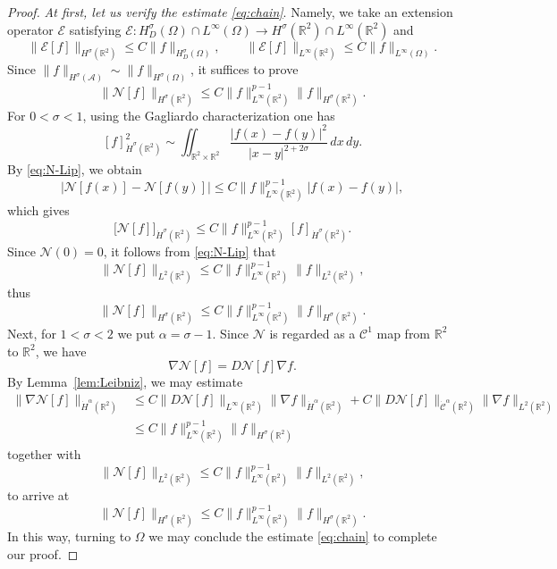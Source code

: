 \documentclass[10pt,a4paper]{amsart}
\numberwithin{equation}{section}
\begin{document}
\begin{proof}
\textit{At first, let us verify the estimate \eqref{eq:chain}}. Namely, we take an extension operator \(\mathcal{E}\) satisfying $\mathcal{E}:H^\sigma_D(\Omega)\cap L^\infty(\Omega)
\to
H^\sigma(\mathbb R^2)\cap L^\infty(\mathbb R^2)$ and
\[
\big\|\mathcal{E}[f]\big\|_{H^\sigma(\mathbb R^2)}
\le C\|f\|_{H^\sigma_D(\Omega)},
\qquad
\big\|\mathcal{E}[f]\big\|_{L^\infty(\mathbb R^2)}
\le C\|f\|_{L^\infty(\Omega)}.
\]
Since $\|f\|_{H^\sigma(\mathcal{A})}
\sim
\|f\|_{H^\sigma(\Omega)}$, it suffices to prove
$$
\big\|\mathcal{N}[f]\big\|_{H^\sigma(\mathbb R^2)}
\le
C
\|f\|_{L^\infty(\mathbb R^2)}^{p-1}
\|f\|_{H^\sigma(\mathbb R^2)}.$$
For $0<\sigma<1$, using the Gagliardo characterization one has
$$
[f]_{\dot H^\sigma(\mathbb R^2)}^2
\sim
\iint_{\mathbb R^2\times\mathbb R^2}
\frac{|f(x)-f(y)|^2}{|x-y|^{2+2\sigma}}
\,dx\,dy.
$$
By \eqref{eq:N-Lip}, we obtain
$$
\big|\mathcal{N}[f(x)]-\mathcal{N}[f(y)]\big|
\le
C
\|f\|_{L^\infty(\mathbb R^2)}^{p-1}
|f(x)-f(y)|,
$$
which gives
$$
\big[\mathcal{N}[f]\big]_{\dot H^\sigma(\mathbb R^2)}
\le
C
\|f\|_{L^\infty(\mathbb R^2)}^{p-1}
[f]_{\dot H^\sigma(\mathbb R^2)}.
$$
Since $\mathcal{N}(0)=0$, it follows from \eqref{eq:N-Lip} that
$$
\big\|\mathcal{N}[f]\big\|_{L^2(\mathbb R^2)}
\le
C
\|f\|_{L^\infty(\mathbb R^2)}^{p-1}
\|f\|_{L^2(\mathbb R^2)},
$$
thus
$$
\big\|\mathcal{N}[f]\big\|_{H^\sigma(\mathbb R^2)}
\le
C
\|f\|_{L^\infty(\mathbb R^2)}^{p-1}
\|f\|_{H^\sigma(\mathbb R^2)}.
$$
Next, for $1<\sigma<2$ we put $\alpha=\sigma-1$. Since $\mathcal{N}$ is regarded as a $\mathcal{C}^1$ map from $\mathbb R^2$ to $\mathbb R^2$, we have
$$
\nabla \mathcal{N}[f] = D\mathcal{N}[f]\nabla f.
$$
By Lemma~\ref{lem:Leibniz}, we may estimate
\begin{align*}
\big\|\nabla \mathcal{N}[f]\big\|_{\dot H^\alpha(\mathbb R^2)}
&\le
C
\big\|D\mathcal{N}[f]\big\|_{L^\infty(\mathbb R^2)}
\|\nabla f\|_{\dot H^\alpha(\mathbb R^2)}
+
C
\big\|D\mathcal{N}[f]\big\|_{\dot{\mathcal{C}}^\alpha(\mathbb R^2)}
\|\nabla f\|_{L^2(\mathbb R^2)} \\
&\le
C
\|f\|_{L^\infty(\mathbb R^2)}^{p-1}
\|f\|_{H^\sigma(\mathbb R^2)}
\end{align*}
together with
$$
\big\|\mathcal{N}[f]\big\|_{L^2(\mathbb R^2)}
\le
C
\|f\|_{L^\infty(\mathbb R^2)}^{p-1}
\|f\|_{L^2(\mathbb R^2)},
$$
to arrive at
$$
\big\|\mathcal{N}[f]\big\|_{H^\sigma(\mathbb R^2)}
\le
C
\|f\|_{L^\infty(\mathbb R^2)}^{p-1}
\|f\|_{H^\sigma(\mathbb R^2)}.
$$
In this way, turning to $\Omega$ we may conclude the estimate \eqref{eq:chain} to complete our proof. \medskip


\end{proof}
\end{document}
